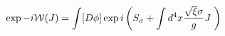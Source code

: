 \begin{equation}
\exp -i\mathcal{W}(J)=\int [D\phi ]\exp i\left( S_{\sigma }+\int d^{4}x\frac{%
\sqrt{\xi}\sigma }{g}J\;\right)  \label{wjsbis}
\end{equation}

